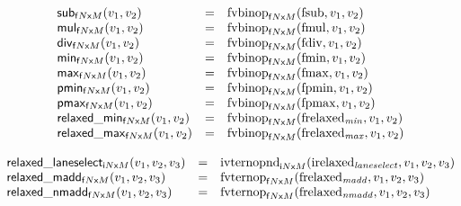 $$\begin{array}[t]{@{}lcl@{}l@{}}
{\mathsf{sub}}{{}_{{{\mathsf{f}}{N}}{\mathsf{x}}{M}}(v_1, v_2)} & = & {{\mathrm{fvbinop}}}_{{{\mathsf{f}}{N}}{\mathsf{x}}{M}}({\mathrm{fsub}}, v_1, v_2) \\
{\mathsf{mul}}{{}_{{{\mathsf{f}}{N}}{\mathsf{x}}{M}}(v_1, v_2)} & = & {{\mathrm{fvbinop}}}_{{{\mathsf{f}}{N}}{\mathsf{x}}{M}}({\mathrm{fmul}}, v_1, v_2) \\
{\mathsf{div}}{{}_{{{\mathsf{f}}{N}}{\mathsf{x}}{M}}(v_1, v_2)} & = & {{\mathrm{fvbinop}}}_{{{\mathsf{f}}{N}}{\mathsf{x}}{M}}({\mathrm{fdiv}}, v_1, v_2) \\
{\mathsf{min}}{{}_{{{\mathsf{f}}{N}}{\mathsf{x}}{M}}(v_1, v_2)} & = & {{\mathrm{fvbinop}}}_{{{\mathsf{f}}{N}}{\mathsf{x}}{M}}({\mathrm{fmin}}, v_1, v_2) \\
{\mathsf{max}}{{}_{{{\mathsf{f}}{N}}{\mathsf{x}}{M}}(v_1, v_2)} & = & {{\mathrm{fvbinop}}}_{{{\mathsf{f}}{N}}{\mathsf{x}}{M}}({\mathrm{fmax}}, v_1, v_2) \\
{\mathsf{pmin}}{{}_{{{\mathsf{f}}{N}}{\mathsf{x}}{M}}(v_1, v_2)} & = & {{\mathrm{fvbinop}}}_{{{\mathsf{f}}{N}}{\mathsf{x}}{M}}({\mathrm{fpmin}}, v_1, v_2) \\
{\mathsf{pmax}}{{}_{{{\mathsf{f}}{N}}{\mathsf{x}}{M}}(v_1, v_2)} & = & {{\mathrm{fvbinop}}}_{{{\mathsf{f}}{N}}{\mathsf{x}}{M}}({\mathrm{fpmax}}, v_1, v_2) \\
{\mathsf{relaxed\_min}}{{}_{{{\mathsf{f}}{N}}{\mathsf{x}}{M}}(v_1, v_2)} & = & {{\mathrm{fvbinop}}}_{{{\mathsf{f}}{N}}{\mathsf{x}}{M}}({\mathrm{frelaxed}}_{{\mathit{min}}}, v_1, v_2) \\
{\mathsf{relaxed\_max}}{{}_{{{\mathsf{f}}{N}}{\mathsf{x}}{M}}(v_1, v_2)} & = & {{\mathrm{fvbinop}}}_{{{\mathsf{f}}{N}}{\mathsf{x}}{M}}({\mathrm{frelaxed}}_{{\mathit{max}}}, v_1, v_2) \\
\end{array}
$$

$$
\begin{array}[t]{@{}lcl@{}l@{}}
{\mathsf{relaxed\_laneselect}}{{}_{{{\mathsf{i}}{N}}{\mathsf{x}}{M}}(v_1, v_2, v_3)} & = & {{\mathrm{ivternopnd}}}_{{{\mathsf{i}}{N}}{\mathsf{x}}{M}}({\mathrm{irelaxed}}_{{\mathit{laneselect}}}, v_1, v_2, v_3) \\
{\mathsf{relaxed\_madd}}{{}_{{{\mathsf{f}}{N}}{\mathsf{x}}{M}}(v_1, v_2, v_3)} & = & {{\mathrm{fvternop}}}_{{{\mathsf{f}}{N}}{\mathsf{x}}{M}}({\mathrm{frelaxed}}_{{\mathit{madd}}}, v_1, v_2, v_3) \\
{\mathsf{relaxed\_nmadd}}{{}_{{{\mathsf{f}}{N}}{\mathsf{x}}{M}}(v_1, v_2, v_3)} & = & {{\mathrm{fvternop}}}_{{{\mathsf{f}}{N}}{\mathsf{x}}{M}}({\mathrm{frelaxed}}_{{\mathit{nmadd}}}, v_1, v_2, v_3) \\
\end{array}
$$

